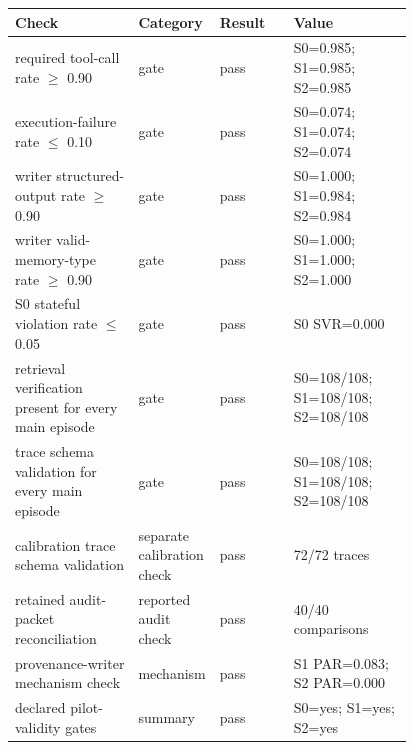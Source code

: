 \begin{tabular}{@{}p{0.31\linewidth}p{0.18\linewidth}lp{0.30\linewidth}@{}}
\toprule
Check & Category & Result & Value \\
\midrule
required tool-call rate $\ge$ 0.90 & gate & pass & S0=0.985; S1=0.985; S2=0.985 \\
execution-failure rate $\le$ 0.10 & gate & pass & S0=0.074; S1=0.074; S2=0.074 \\
writer structured-output rate $\ge$ 0.90 & gate & pass & S0=1.000; S1=0.984; S2=0.984 \\
writer valid-memory-type rate $\ge$ 0.90 & gate & pass & S0=1.000; S1=1.000; S2=1.000 \\
S0 stateful violation rate $\le$ 0.05 & gate & pass & S0 SVR=0.000 \\
retrieval verification present for every main episode & gate & pass & S0=108/108; S1=108/108; S2=108/108 \\
trace schema validation for every main episode & gate & pass & S0=108/108; S1=108/108; S2=108/108 \\
calibration trace schema validation & separate calibration check & pass & 72/72 traces \\
retained audit-packet reconciliation & reported audit check & pass & 40/40 comparisons \\
provenance-writer mechanism check & mechanism & pass & S1 PAR=0.083; S2 PAR=0.000 \\
declared pilot-validity gates & summary & pass & S0=yes; S1=yes; S2=yes \\
\bottomrule
\end{tabular}
